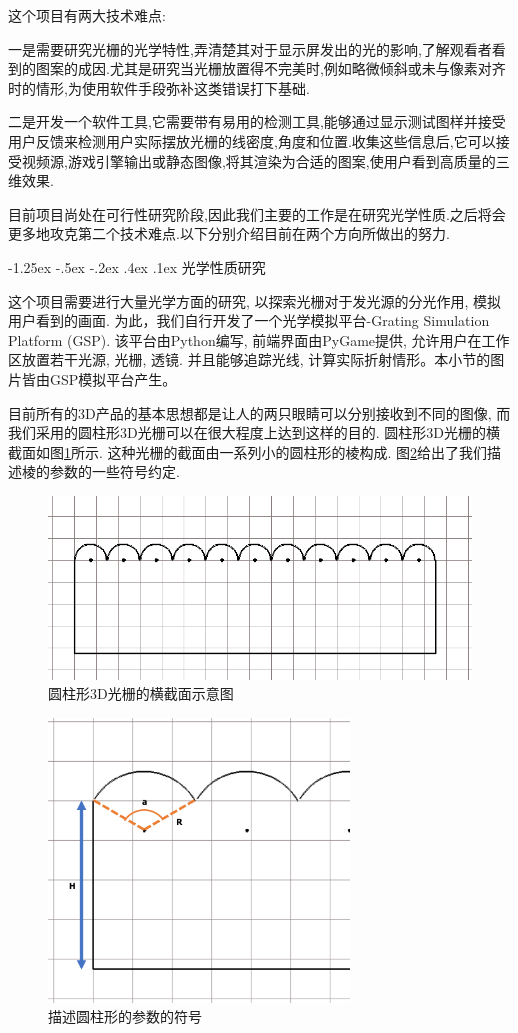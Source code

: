 \documentclass[a4paper, 11pt]{article}
\makeatletter
\newcommand{\xiaosihao}{\fontsize{12pt}{\baselineskip}\selectfont}
\renewcommand\subsection{\@startsection{subsection}{1}{\z@}%
{-1.25ex \@plus -.5ex \@minus -.2ex}%
{.4ex \@plus .1ex}%
{\normalfont\xiaosihao\CJKfamily{hei}}}
\makeatother
\begin{document}
\begin{CJK}{UTF8}{gbsn}
这个项目有两大技术难点:

一是需要研究光栅的光学特性,弄清楚其对于显示屏发出的光的影响,了解观看者看到的图案的成因.尤其是研究当光栅放置得不完美时,例如略微倾斜或未与像素对齐时的情形,为使用软件手段弥补这类错误打下基础.

二是开发一个软件工具,它需要带有易用的检测工具,能够通过显示测试图样并接受用户反馈来检测用户实际摆放光栅的线密度,角度和位置.收集这些信息后,它可以接受视频源,游戏引擎输出或静态图像,将其渲染为合适的图案,使用户看到高质量的三维效果.

目前项目尚处在可行性研究阶段,因此我们主要的工作是在研究光学性质.之后将会更多地攻克第二个技术难点.以下分别介绍目前在两个方向所做出的努力.

\subsection{光学性质研究}

这个项目需要进行大量光学方面的研究, 以探索光栅对于发光源的分光作用, 模拟用户看到的画面. 为此，我们自行开发了一个光学模拟平台-Grating Simulation Platform (GSP). 该平台由Python编写, 前端界面由PyGame提供, 允许用户在工作区放置若干光源, 光栅, 透镜. 并且能够追踪光线, 计算实际折射情形。本小节的图片皆由GSP模拟平台产生。

目前所有的3D产品的基本思想都是让人的两只眼睛可以分别接收到不同的图像, 而我们采用的圆柱形3D光栅可以在很大程度上达到这样的目的. 圆柱形3D光栅的横截面如图\ref{fig:226}所示. 这种光栅的截面由一系列小的圆柱形的棱构成. 图\ref{fig:227}给出了我们描述棱的参数的一些符号约定.
\begin{figure}[h!]
  \centerline{\includegraphics[width=\linewidth]{226.png}}
  \caption{圆柱形3D光栅的横截面示意图}
  \label{fig:226}
\end{figure}
\begin{figure}[h!]
  \centerline{\includegraphics[width=8cm]{227.png}}
  \caption{描述圆柱形的参数的符号}
  \label{fig:227}
\end{figure}


\end{CJK}
\end{document}
